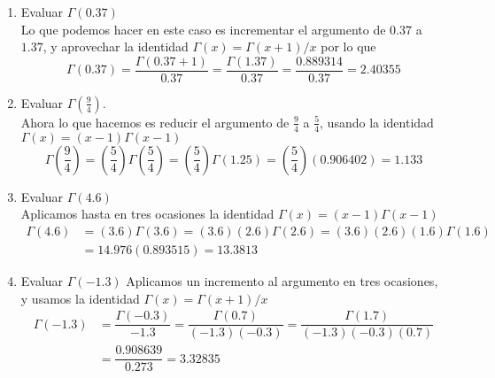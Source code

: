 \begin{enumerate}
\item Evaluar $\Gamma(0.37)$
\\
Lo que podemos hacer en este caso es incrementar el argumento de $0.37$ a $1.37$, y aprovechar la identidad $\Gamma(x) = \Gamma(x+1)/x$ por lo que
\[ \Gamma(0.37) = \dfrac{\Gamma(0.37 + 1)}{0.37} = \dfrac{\Gamma(1.37)}{0.37} =\dfrac{0.889314}{0.37} = 2.40355 \]
\item Evaluar $\Gamma(\frac{9}{4})$.
\\
Ahora lo que hacemos es reducir el argumento de $\frac{9}{4}$ a $\frac{5}{4}$, usando la identidad $\Gamma(x) = (x-1) \Gamma(x-1)$
\[ \Gamma \left( \dfrac{9}{4} \right) = \left( \dfrac{5}{4} \right) \Gamma \left( \dfrac{5}{4} \right) = \left( \dfrac{5}{4} \right) \Gamma(1.25) = \left( \dfrac{5}{4} \right) (0.906402) = 1.133 \]
\item Evaluar $\Gamma(4.6)$
\\
Aplicamos hasta en tres ocasiones la identidad $\Gamma(x) = (x-1) \Gamma(x-1)$
\[ \begin{split}
\Gamma(4.6) &= (3.6) \Gamma(3.6) = (3.6) (2.6) \Gamma(2.6) = (3.6)(2.6)(1.6) \Gamma(1.6) \\
&= 14.976 (0.893515) = 13.3813
\end{split} \]
\item Evaluar $\Gamma(-1.3)$
Aplicamos un incremento al argumento en tres ocasiones, y usamos la identidad $\Gamma(x)= \Gamma(x+1) /x$
\[ \begin{split}
\Gamma(-1.3) &= \dfrac{\Gamma(-0.3)}{-1.3} = \dfrac{\Gamma(0.7)}{(-1.3)(-0.3)} = \dfrac{\Gamma(1.7)}{(-1.3)(-0.3)(0.7)} \\
&= \dfrac{0.908639}{0.273} = 3.32835
\end{split} \]
\end{enumerate}

